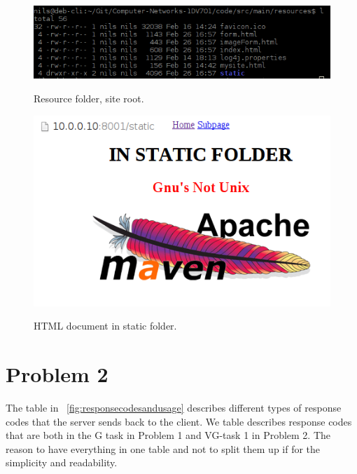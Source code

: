 \documentclass[a4paper,12pt]{article} %
\begin{document}
{\begin{figure}[H]
    \centering  
    \includegraphics[scale=0.5]{img/screenshots/filesresourcefolder.png}
	\label{fig:filesresourcefolder}
	\caption{Resource folder, site root.}
\end{figure}


\begin{figure}[H]
    \centering  
    \includegraphics[scale=0.6]{img/screenshots/htmlstatic.png}
	\label{fig:htmlstatic}
	\caption{HTML document in static folder.}
\end{figure}



\section{Problem 2}

The table in ~\ref{fig:responsecodesandusage} describes different types of response codes that the server sends back to the client.
We table describes response codes that are both in the G task in Problem 1 and VG-task 1 in Problem 2.
The reason to have everything in one table and not to split them up if for the simplicity and readability.

\begin{figure}[H]


\end{figure}}
\end{document}
